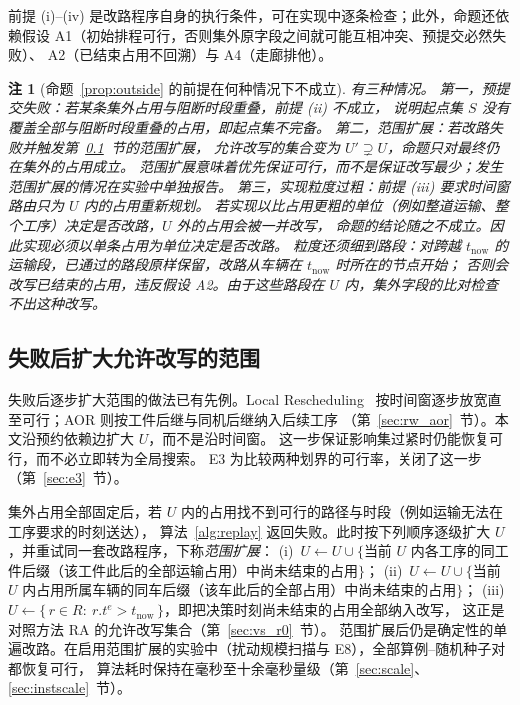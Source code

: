 \documentclass[manuscript,screen,review]{acmart}
\newtheorem{remark}{注}
\begin{document}
前提 (i)--(iv) 是改路程序自身的执行条件，可在实现中逐条检查；此外，命题还依赖假设
A1（初始排程可行，否则集外原字段之间就可能互相冲突、预提交必然失败）、
A2（已结束占用不回溯）与 A4（走廊排他）。

\begin{remark}[命题~\ref{prop:outside} 的前提在何种情况下不成立]
\label{rem:precommit}
有三种情况。
第一，预提交失败：若某条集外占用与阻断时段重叠，前提 (ii) 不成立，
说明起点集 \(S\) 没有覆盖全部与阻断时段重叠的占用，即起点集不完备。
第二，范围扩展：若改路失败并触发第~\ref{sec:scope_escalation}~节的范围扩展，
允许改写的集合变为 \(U'\supsetneq U\)，命题只对最终仍在集外的占用成立。
范围扩展意味着优先保证可行，而不是保证改写最少；发生范围扩展的情况在实验中单独报告。
第三，实现粒度过粗：前提 (iii) 要求时间窗路由\emph{只}为 \(U\) 内的占用重新规划。
若实现以比占用更粗的单位（例如整道运输、整个工序）决定是否改路，\(U\) 外的占用会被一并改写，
命题的结论随之不成立。因此实现必须以单条占用为单位决定是否改路。
粒度还须细到路段：对跨越 \(t_{\mathrm{now}}\) 的运输段，已通过的路段原样保留，改路从车辆在 \(t_{\mathrm{now}}\) 时所在的节点开始；
否则会改写已结束的占用，违反假设 A2。由于这些路段在 \(U\) 内，集外字段的比对检查不出这种改写。
\end{remark}

\subsection{失败后扩大允许改写的范围}
\label{sec:scope_escalation}

失败后逐步扩大范围的做法已有先例。Local Rescheduling~\cite{kuster2007local}
按时间窗逐步放宽直至可行；AOR 则按工件后继与同机后继纳入后续工序
（第~\ref{sec:rw_aor}~节）。本文沿预约依赖边扩大 \(U\)，而不是沿时间窗。
这一步保证影响集过紧时仍能恢复可行，而不必立即转为全局搜索。
E3 为比较两种划界的可行率，关闭了这一步（第~\ref{sec:e3}~节）。

集外占用全部固定后，若 \(U\) 内的占用找不到可行的路径与时段（例如运输无法在工序要求的时刻送达），
算法~\ref{alg:replay} 返回失败。此时按下列顺序逐级扩大 \(U\)，并重试同一套改路程序，下称\emph{范围扩展}：
(i)~\(U\leftarrow U\cup\{\)当前 \(U\) 内各工序的同工件后缀（该工件此后的全部运输占用）中尚未结束的占用\(\}\)；
(ii)~\(U\leftarrow U\cup\{\)当前 \(U\) 内占用所属车辆的同车后缀（该车此后的全部占用）中尚未结束的占用\(\}\)；
(iii)~\(U\leftarrow\{\,r\in R:\ r.t^e>t_{\mathrm{now}}\,\}\)，即把决策时刻尚未结束的占用全部纳入改写，
这正是对照方法 RA 的允许改写集合（第~\ref{sec:vs_r0}~节）。
范围扩展后仍是确定性的单遍改路。在启用范围扩展的实验中（扰动规模扫描与 E8），全部算例--随机种子对都恢复可行，
算法耗时保持在毫秒至十余毫秒量级（第~\ref{sec:scale}、\ref{sec:instscale}~节）。
\end{document}
